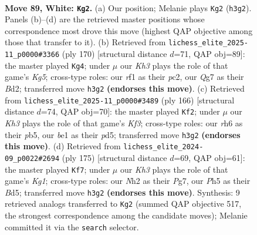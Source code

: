 \documentclass[11pt]{article}
\begin{document}
\clearpage

\begin{figure}[p]\centering
\begin{subfigure}{0.46\textwidth}\centering
\resizebox{\linewidth}{!}{%
\newchessgame
\chessboard[
  setfen={4k3/p5Q1/7r/7P/3P4/4q2K/7N/4br2 w - - 0 89},
  showmover=false,
  pgfstyle=straightmove, color=movearrow, markmove={h3-g2}
]}
\caption{}
\end{subfigure}\hfill
\begin{subfigure}{0.46\textwidth}\centering
\resizebox{\linewidth}{!}{%
\newchessgame
\chessboard[
  setfen={6r1/6P1/7P/3q2K1/4k3/8/2pB4/8 w - - 6 86},
  showmover=false,
  pgfstyle=straightmove, color=movearrow, markmove={g5-g4}
]}
\caption{}
\end{subfigure}
\\[4pt]
\begin{subfigure}{0.46\textwidth}\centering
\resizebox{\linewidth}{!}{%
\newchessgame
\chessboard[
  setfen={8/6k1/2Q1P2p/1pPp4/1P6/2q2K2/8/8 w - - 24 84},
  showmover=false,
  pgfstyle=straightmove, color=movearrow, markmove={f3-f2}
]}
\caption{}
\end{subfigure}\hfill
\begin{subfigure}{0.46\textwidth}\centering
\resizebox{\linewidth}{!}{%
\newchessgame
\chessboard[
  setfen={2Q3k1/6p1/4p3/3bP1p1/3R2P1/8/5q2/2K5 b - - 15 88},
  showmover=false,
  pgfstyle=straightmove, color=movearrow, markmove={g8-f7}
]}
\caption{}
\end{subfigure}
\caption{\textbf{Move 89, White: \texttt{Kg2}.} (a) Our position; Melanie plays \texttt{Kg2} (\texttt{h3g2}). Panels (b)--(d) are the retrieved master positions whose correspondence most drove this move (highest QAP objective among those that transfer to it). (b) Retrieved from \texttt{lichess\_elite\_2025-11\_p0000\#3366} (ply 170) [structural distance $d$=71, QAP obj=89]: the master played \texttt{Kg4}; under $\mu$ our \emph{Kh3} plays the role of that game's \emph{Kg5}; cross-type roles: our \emph{r}f1 as their \emph{p}c2, our \emph{Q}g7 as their \emph{B}d2; transferred move \texttt{h3g2} \textbf{(endorses this move)}. (c) Retrieved from \texttt{lichess\_elite\_2025-11\_p0000\#3489} (ply 166) [structural distance $d$=74, QAP obj=70]: the master played \texttt{Kf2}; under $\mu$ our \emph{Kh3} plays the role of that game's \emph{Kf3}; cross-type roles: our \emph{r}h6 as their \emph{p}b5, our \emph{b}e1 as their \emph{p}d5; transferred move \texttt{h3g2} \textbf{(endorses this move)}. (d) Retrieved from \texttt{lichess\_elite\_2024-09\_p0022\#2694} (ply 175) [structural distance $d$=69, QAP obj=61]: the master played \texttt{Kf7}; under $\mu$ our \emph{Kh3} plays the role of that game's \emph{Kg1}; cross-type roles: our \emph{N}h2 as their \emph{P}g7, our \emph{P}h5 as their \emph{B}d5; transferred move \texttt{h3g2} \textbf{(endorses this move)}. Synthesis: 9 retrieved analogs transferred to \texttt{Kg2} (summed QAP objective 517, the strongest correspondence among the candidate moves); Melanie committed it via the \texttt{search} selector.}
\label{fig:thought-m176}
\end{figure}
\end{document}

